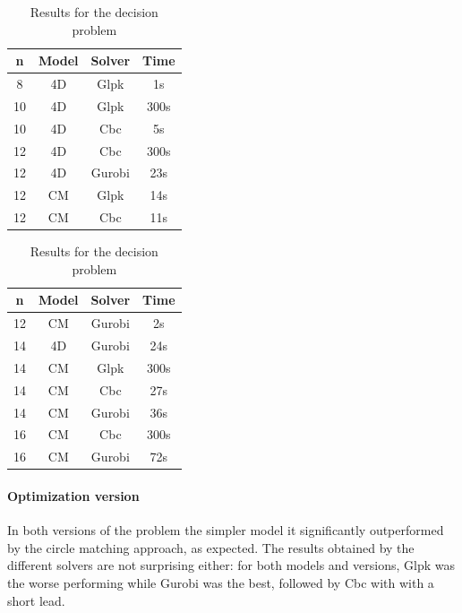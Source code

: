 \begin{table}[H]
    \centering
    \begin{tabular}{|c|c|c|c|}
    \hline
        \textbf{n} &  \textbf{Model} & \textbf{Solver} & \textbf{Time} \\
    \hline
         8 & 4D & Glpk & 1s \\
         10 & 4D & Glpk & 300s \\
         10 & 4D & Cbc & 5s \\
         12 & 4D & Cbc & 300s \\
         12 & 4D & Gurobi & 23s \\
         12 & CM & Glpk & 14s \\
         12 & CM & Cbc & 11s \\
    \hline
    \end{tabular}
    \begin{tabular}{|c|c|c|c|}
    \hline
        \textbf{n} &  \textbf{Model} & \textbf{Solver} & \textbf{Time} \\
    \hline
        12 & CM & Gurobi & 2s \\
         14 & 4D & Gurobi & 24s \\
         14 & CM & Glpk & 300s \\
         14 & CM & Cbc & 27s \\
         14 & CM & Gurobi & 36s \\
         16 & CM & Cbc & 300s \\
         16 & CM & Gurobi & 72s \\
    \hline
    \end{tabular}
    \caption{Results for the decision problem}
    \label{tab:mip1}
\end{table}

\paragraph{Optimization version}
In both versions of the problem the simpler model it significantly outperformed by the circle matching approach, as expected.
The results obtained by the different solvers are not surprising either: for both models and versions, Glpk was the worse performing while Gurobi was the best, followed by Cbc with with a short lead.

